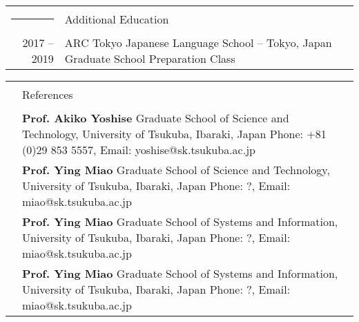 \documentclass[letterpaper,10pt]{article}
\newcommand{\headingfont}{\LARGE }
\newenvironment{SectionTable}[1]{
	\renewcommand*{\arraystretch}{1.0}
	\setlength{\tabcolsep}{10pt}
	\begin{longtable}{Rp{5.2in}} 
		\rule{2.5cm}{4pt} 
		& #1 \\ %
	}
	{
	\end{longtable}\vspace{-.3cm}
}
\begin{document}

\begin{SectionTable}{\headingfont Additional Education}
	2017 -- 2019 & ARC Tokyo Japanese Language School -- Tokyo, Japan \newline
	Graduate School Preparation Class \\
\end{SectionTable}




\begin{SectionTable}{\headingfont References}
	&
	\textbf{Prof. Akiko Yoshise} \newline
	Graduate School of Science and Technology, University of Tsukuba, Ibaraki, Japan \newline 
	Phone: +81 (0)29 853 5557, Email: yoshise@sk.tsukuba.ac.jp  \\
	
	& 
	\textbf{Prof. Ying Miao} \newline
	Graduate School of Science and Technology, University of Tsukuba, Ibaraki, Japan \newline 
	Phone: ?, Email: miao@sk.tsukuba.ac.jp\\
	
	& 
	\textbf{Prof. Ying Miao} \newline
	Graduate School of Systems and Information, University of Tsukuba, Ibaraki, Japan \newline 
	Phone: ?, Email: miao@sk.tsukuba.ac.jp\\
	
	&
	\textbf{Prof. Ying Miao} \newline
	Graduate School of Systems and Information, University of Tsukuba, Ibaraki, Japan \newline 
	Phone: ?, Email: miao@sk.tsukuba.ac.jp\\
\end{SectionTable}
	

\label{LastPage}  %
\end{document}
